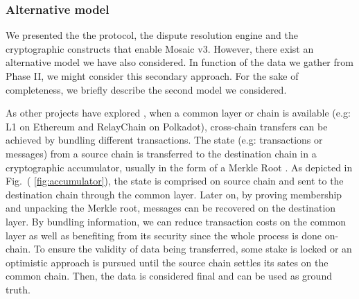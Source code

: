 \subsubsection{Alternative model}
We presented the the protocol, the dispute resolution engine and the cryptographic constructs that enable Mosaic v3. However, there exist an alternative model we have also considered. In function of the data we gather from Phase II, we might consider this secondary approach. For the sake of completeness, we briefly describe the second model we considered.

As other projects have explored \cite{HopRollups, MOVRMOVR}, when a common layer or chain is available (e.g: L1 on Ethereum and RelayChain on Polkadot), cross-chain transfers can be achieved by bundling different transactions. The state (e.g: transactions or messages) from a source chain is transferred to the destination chain in a cryptographic accumulator, usually in the form of a Merkle Root \cite{Becker2008MerkleCryptanalysis}. As depicted in Fig.~( \ref{fig:accumulator}), the state is comprised on source chain and sent to the destination chain through the common layer. Later on, by proving membership  and unpacking the Merkle root, messages can be recovered on the destination layer.  By bundling information, we can reduce transaction costs on the common layer as well as benefiting from its security since the whole process is done on-chain. To ensure the validity of data being transferred, some stake is locked or an optimistic approach is pursued until the source chain settles its sates on the common chain. Then, the data is considered final and can be used as ground truth.

